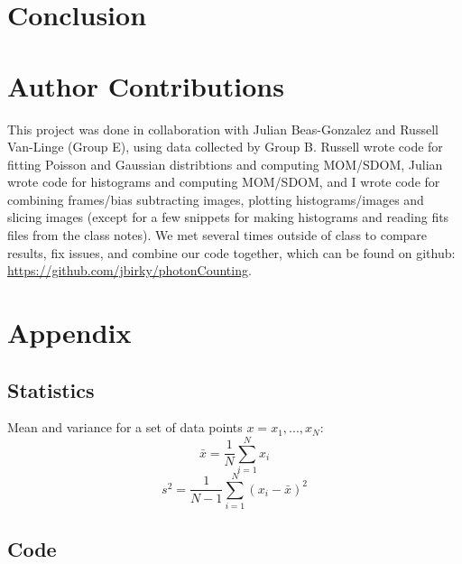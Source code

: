 \documentclass[preprint]{aastex62}
\begin{document}
\section{Conclusion}

\section{Author Contributions}

This project was done in collaboration with Julian Beas-Gonzalez and Russell Van-Linge (Group E), using data collected by Group B. Russell wrote code for fitting Poisson and Gaussian distribtions and computing MOM/SDOM, Julian wrote code for histograms and computing MOM/SDOM, and I wrote code for combining frames/bias subtracting images, plotting histograms/images and slicing images (except for a few snippets for making histograms and reading fits files from the class notes). We met several times outside of class to compare results, fix issues, and combine our code together, which can be found on github: \href{https://github.com/jbirky/photonCounting}{https://github.com/jbirky/photonCounting}.

\section{Appendix}

\subsection{Statistics}
Mean and variance for a set of data points $x={x_1, ...,x_N}$:
\begin{equation}
	\bar{x} = \frac{1}{N} \sum^N_{i=1} x_i  
\end{equation}
\begin{equation}
	s^2 = \frac{1}{N-1} \sum^N_{i=1} (x_i - \bar{x})^2
\end{equation}

\subsection{Code}
\end{document}
